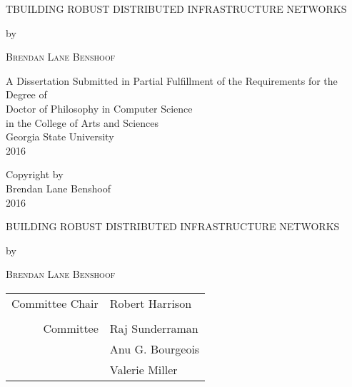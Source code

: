\documentclass[12pt,letterpaper]{report}
\begin{document}
	\newpage 
	\begin{titlepage}
		
		\begin{center}
			{\scshape TBUILDING ROBUST DISTRIBUTED INFRASTRUCTURE NETWORKS\par}
			\vspace{5cm}
			{by\par}
			\vspace{5cm}
			{\scshape Brendan Lane Benshoof\par}
			
			\vfill
			A Dissertation Submitted in Partial Fulfillment of the Requirements for the Degree of\\
			Doctor of Philosophy in Computer Science\\
			in the College of Arts and Sciences\\
			Georgia State University\\
			2016
		\end{center}
	\end{titlepage}
	
	
	
	
	
	
	\null\vfill
	\begin{center}
		
		Copyright by \\
		Brendan Lane Benshoof\\
		2016
	\end{center}
	\newpage
	
	
	
	\begin{center}
		{\scshape BUILDING ROBUST DISTRIBUTED INFRASTRUCTURE NETWORKS\par}
		\vspace{5cm}
		{by\par}
		\vspace{5cm}
		{\scshape Brendan Lane Benshoof\par}
	\end{center}
	\vfill
	\hfill\begin{tabular}{rl}
		Committee Chair & Robert Harrison \\ 
		&  \\ 
		Committee &  Raj Sunderraman \\ 
		& Anu G. Bourgeois\\ 
		& Valerie Miller 
	\end{tabular} 
	
\end{document}
